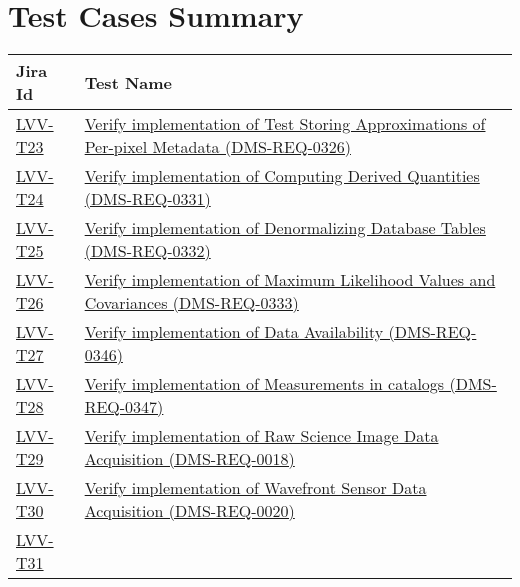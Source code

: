 \hypertarget{test-cases-summary}{%
\section{Test Cases Summary}\label{test-cases-summary}}

\begin{longtable}[]{p{3cm}p{13cm}}
\toprule
Jira Id & Test Name\tabularnewline
\midrule
\endhead
\protect\hyperlink{lvv-t23---verify-implementation-of-test-storing-approximations-of-per-pixel-metadata-dms-req-0326}{LVV-T23}
&
\href{https://jira.lsstcorp.org/secure/Tests.jspa\#/testCase/LVV-T23}{Verify
implementation of Test Storing Approximations of Per-pixel Metadata
(DMS-REQ-0326)}\tabularnewline
\protect\hyperlink{lvv-t24---verify-implementation-of-computing-derived-quantities-dms-req-0331}{LVV-T24}
&
\href{https://jira.lsstcorp.org/secure/Tests.jspa\#/testCase/LVV-T24}{Verify
implementation of Computing Derived Quantities
(DMS-REQ-0331)}\tabularnewline
\protect\hyperlink{lvv-t25---verify-implementation-of-denormalizing-database-tables-dms-req-0332}{LVV-T25}
&
\href{https://jira.lsstcorp.org/secure/Tests.jspa\#/testCase/LVV-T25}{Verify
implementation of Denormalizing Database Tables
(DMS-REQ-0332)}\tabularnewline
\protect\hyperlink{lvv-t26---verify-implementation-of-maximum-likelihood-values-and-covariances-dms-req-0333}{LVV-T26}
&
\href{https://jira.lsstcorp.org/secure/Tests.jspa\#/testCase/LVV-T26}{Verify
implementation of Maximum Likelihood Values and Covariances
(DMS-REQ-0333)}\tabularnewline
\protect\hyperlink{lvv-t27---verify-implementation-of-data-availability-dms-req-0346}{LVV-T27}
&
\href{https://jira.lsstcorp.org/secure/Tests.jspa\#/testCase/LVV-T27}{Verify
implementation of Data Availability (DMS-REQ-0346)}\tabularnewline
\protect\hyperlink{lvv-t28---verify-implementation-of-measurements-in-catalogs-dms-req-0347}{LVV-T28}
&
\href{https://jira.lsstcorp.org/secure/Tests.jspa\#/testCase/LVV-T28}{Verify
implementation of Measurements in catalogs
(DMS-REQ-0347)}\tabularnewline
\protect\hyperlink{lvv-t29---verify-implementation-of-raw-science-image-data-acquisition-dms-req-0018}{LVV-T29}
&
\href{https://jira.lsstcorp.org/secure/Tests.jspa\#/testCase/LVV-T29}{Verify
implementation of Raw Science Image Data Acquisition
(DMS-REQ-0018)}\tabularnewline
\protect\hyperlink{lvv-t30---verify-implementation-of-wavefront-sensor-data-acquisition-dms-req-0020}{LVV-T30}
&
\href{https://jira.lsstcorp.org/secure/Tests.jspa\#/testCase/LVV-T30}{Verify
implementation of Wavefront Sensor Data Acquisition
(DMS-REQ-0020)}\tabularnewline
\protect\hyperlink{lvv-t31---verify-implementation-of-crosstalk-corrected-science-image-data-acquisition-dms-req-0022}{LVV-T31}

\end{longtable}
